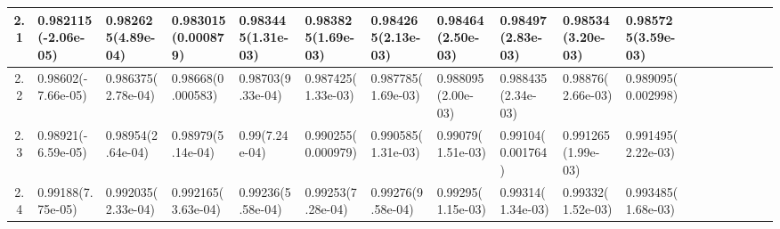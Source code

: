 \documentclass[
	article,			%
	12pt,				%
	twoside,			%
	a4paper,			%
	english,			%
	brazil,				%
	]{abntex2}
\begin{document}
\begin{landscape}
\begin{table}
\begin{tabular}{c||p{18mm}|p{18mm}|p{18mm}|p{18mm}|p{18mm}|p{18mm}|p{18mm}|p{18mm}|p{18mm}|p{18mm}|p{18mm}|p{18mm}|p{18mm}|p{18mm}|p{18mm}|p{18mm}|p{18mm}}
    			2.1 &0.982115\newline(-2.06e-05)&0.982625\newline(4.89e-04)&0.983015\newline(0.000879)&0.983445\newline(1.31e-03)&0.983825\newline(1.69e-03)&0.984265\newline(2.13e-03)&0.98464\newline(2.50e-03)&0.98497\newline(2.83e-03)&0.98534\newline(3.20e-03)&0.985725\newline(3.59e-03)\\\hline
    			2.2 &0.98602\newline(-7.66e-05)&0.986375\newline(2.78e-04)&0.98668\newline(0.000583)&0.98703\newline(9.33e-04)&0.987425\newline(1.33e-03)&0.987785\newline(1.69e-03)&0.988095\newline(2.00e-03)&0.988435\newline(2.34e-03)&0.98876\newline(2.66e-03)&0.989095\newline(0.002998)\\\hline
    			2.3 &0.98921\newline(-6.59e-05)&0.98954\newline(2.64e-04)&0.98979\newline(5.14e-04)&0.99\newline(7.24e-04)&0.990255\newline(0.000979)&0.990585\newline(1.31e-03)&0.99079\newline(1.51e-03)&0.99104\newline(0.001764)&0.991265\newline(1.99e-03)&0.991495\newline(2.22e-03)\\\hline
    			2.4 &0.99188\newline(7.75e-05)&0.992035\newline(2.33e-04)&0.992165\newline(3.63e-04)&0.99236\newline(5.58e-04)&0.99253\newline(7.28e-04)&0.99276\newline(9.58e-04)&0.99295\newline(1.15e-03)&0.99314\newline(1.34e-03)&0.99332\newline(1.52e-03)&0.993485\newline(1.68e-03)\\\hline
    			

\end{tabular}
\end{table}
\end{landscape}
\end{document}
